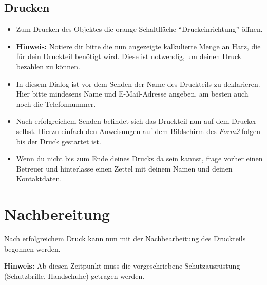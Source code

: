\documentclass{\basedir/fablab-document}
\begin{document}
\subsection{Drucken}
\begin{itemize}

    \item Zum Drucken des Objektes die orange Schaltfläche \enquote{Druckeinrichtung} öffnen.\\
    \item \textbf{Hinweis:} Notiere dir bitte die nun angezeigte kalkulierte Menge an Harz, die für dein Druckteil benötigt wird. Diese ist notwendig, um deinen Druck bezahlen zu können.
    \item In diesem Dialog ist vor dem Senden der Name des Druckteils zu deklarieren. Hier bitte mindesens Name und E-Mail-Adresse angeben, am besten auch noch die Telefonnummer.\\
    \item Nach erfolgreichem Senden befindet sich das Druckteil nun auf dem Drucker selbst. Hierzu einfach den Anweisungen auf dem Bildschirm des \textit{Form2} folgen bis der Druck gestartet ist.
    \item Wenn du nicht bis zum Ende deines Drucks da sein kannst, frage vorher einen Betreuer und hinterlasse einen Zettel mit deinem Namen und deinen Kontaktdaten.

\end{itemize}

\pagebreak


\section{Nachbereitung}

Nach erfolgreichem Druck kann nun mit der Nachbearbeitung des Druckteils begonnen werden.

\textbf{Hinweis:} Ab diesen Zeitpunkt muss die vorgeschriebene Schutzausrüstung (Schutzbrille, Handschuhe) getragen werden.
\end{document}
